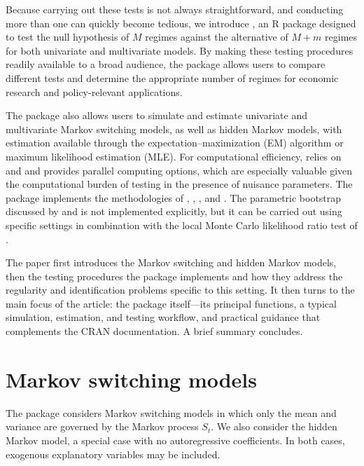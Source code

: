 Because carrying out these tests is not always straightforward, and conducting more than one can quickly become tedious, we introduce , an R package designed to test the null hypothesis of \(M\) regimes against the alternative of \(M+m\) regimes for both univariate and multivariate models. By making these testing procedures readily available to a broad audience, the package allows users to compare different tests and determine the appropriate number of regimes for economic research and policy-relevant applications.

The package also allows users to simulate and estimate univariate and multivariate Markov switching models, as well as hidden Markov models, with estimation available through the expectation--maximization (EM) algorithm or maximum likelihood estimation (MLE). For computational efficiency,  relies on  \citep{eddetal2018} and  \citep{eddsan2024} and provides parallel computing options, which are especially valuable given the computational burden of testing in the presence of nuisance parameters. The package implements the methodologies of \citet{rodrondufour_mcmstest}, \citet{dufourluger17}, \citet{chp14}, and \citet{hansen92}. The parametric bootstrap discussed by \citet{quzhuo2021likelihood} and \citet{kasshi2018} is not implemented explicitly, but it can be carried out using specific settings in combination with the local Monte Carlo likelihood ratio test of \citet{rodrondufour_mcmstest}.

The paper first introduces the Markov switching and hidden Markov models, then the testing procedures the package implements and how they address the regularity and identification problems specific to this setting. It then turns to the main focus of the article: the  package itself---its principal functions, a typical simulation, estimation, and testing workflow, and practical guidance that complements the CRAN documentation. A brief summary concludes.

\section{Markov switching models}\label{models}

The  package considers Markov switching models in which only the mean and variance are governed by the Markov process \(S_t\). We also consider the hidden Markov model, a special case with no autoregressive coefficients. In both cases, exogenous explanatory variables may be included.

